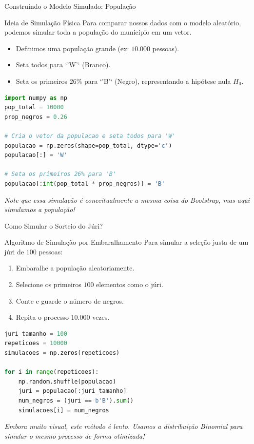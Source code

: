 \begin{frame}[fragile]{Construindo o Modelo Simulado: População}
    \begin{block}{Ideia de Simulação Física}
        Para comparar nossos dados com o modelo aleatório, podemos simular toda a população do município em um vetor.
        \begin{itemize}
            \item Definimos uma população grande (ex: $10.000$ pessoas).
            \item Seta todos para `'W'` (Branco).
            \item Seta os primeiros $26\%$ para `'B'` (Negro), representando a hipótese nula $H_0$.
        \end{itemize}
    \end{block}
\begin{lstlisting}[language=Python]
import numpy as np
pop_total = 10000
prop_negros = 0.26

# Cria o vetor da populacao e seta todos para 'W'
populacao = np.zeros(shape=pop_total, dtype='c')
populacao[:] = 'W'

# Seta os primeiros 26% para 'B'
populacao[:int(pop_total * prop_negros)] = 'B'
\end{lstlisting}
    \centering
    \vspace{0.1cm}
    \textit{Note que essa simulação é conceitualmente a mesma coisa do Bootstrap, mas aqui simulamos a população!}
\end{frame}

\begin{frame}[fragile]{Como Simular o Sorteio do Júri?}
    \begin{block}{Algoritmo de Simulação por Embaralhamento}
        Para simular a seleção justa de um júri de $100$ pessoas:
        \begin{enumerate}
            \item Embaralhe a população aleatoriamente.
            \item Selecione os primeiros $100$ elementos como o júri.
            \item Conte e guarde o número de negros.
            \item Repita o processo $10.000$ vezes.
        \end{enumerate}
    \end{block}
\begin{lstlisting}[language=Python]
juri_tamanho = 100
repeticoes = 10000
simulacoes = np.zeros(repeticoes)

for i in range(repeticoes):
    np.random.shuffle(populacao)
    juri = populacao[:juri_tamanho]
    num_negros = (juri == b'B').sum()
    simulacoes[i] = num_negros
\end{lstlisting}
    \centering
    \vspace{0.1cm}
    \textit{Embora muito visual, este método é lento. Usamos a distribuição Binomial para simular o mesmo processo de forma otimizada!}
\end{frame}


